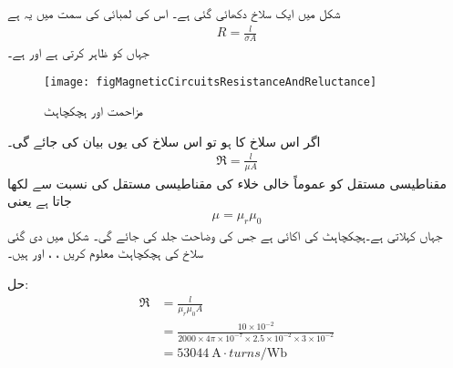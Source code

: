 شکل   میں ایک سلاخ دکھائی گئی ہے۔ اس کی لمبائی کی سمت میں   یہ ہے
\begin{align}\label{مساوات_مقناطیسی_دور_مزاحمت_کی_تعریف}
R=\frac{l }{\sigma A}
\end{align}
جہاں    کو ظاہر کرتی ہے اور   ہے۔
\begin{figure}
\centering
\texttt{[image: figMagneticCircuitsResistanceAndReluctance]}
\caption{مزاحمت اور ہچکچاہٹ}
\label{شکل_مقناطیسی_دور_مزاحمت_ہچکچاہٹ}
\end{figure}
اگر اس سلاخ کا    ہو تو اس سلاخ کی    یوں بیان کی جائے گی۔
\begin{align}\label{مساوات_مقناطیسی_دور_ہچکچاہٹ_کی_تعریف}
\Re = \frac{l}{\mu A}
\end{align}
مقناطیسی مستقل  کو عموماً خالی خلاء کی مقناطیسی مستقل  کی نسبت سے لکھا جاتا ہے یعنی
\begin{align}
\mu=\mu_r \mu_0
\end{align}
جہاں    کہلاتی ہے۔ہچکچاہٹ کی اکائی   ہے جس کی وضاحت جلد کی جائے گی۔
%
شکل  میں دی گئی سلاخ کی ہچکچاہٹ معلوم کریں
، ،  اور  ہیں۔

حل:
\begin{align*}
\Re& = \frac{l}{\mu_r \mu_0 A}\\
&=\frac{10\times 10^{-2}}{2000 \times 4 \pi \times 10^{-7} \times 2.5 \times 10^{-2} \times 3 \times 10^{-2}}\\
&=\SI{53044}{\ampere \cdot turns \per \weber}
\end{align*}

